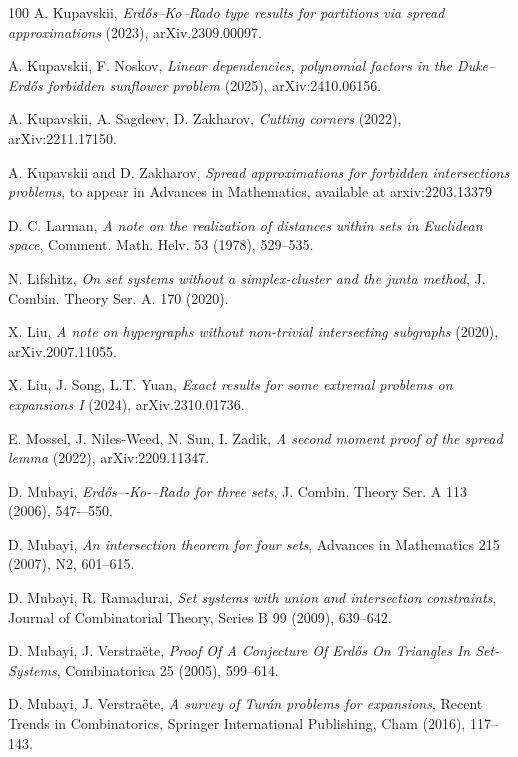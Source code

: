 \documentclass[graybox]{svmult}
\begin{document}
\begin{thebibliography}{100}
 A. Kupavskii, {\it Erd\H os--Ko--Rado type results for partitions via spread approximations} (2023), arXiv.2309.00097.

 A. Kupavskii, F. Noskov, {\it Linear dependencies, polynomial factors in the Duke--Erd\H os forbidden sunflower problem} (2025), arXiv:2410.06156.


 A. Kupavskii, A. Sagdeev, D. Zakharov, {\it Cutting corners} (2022), arXiv:2211.17150.

 A. Kupavskii and D. Zakharov, {\it Spread approximations for forbidden intersections problems},  to appear in Advances in Mathematics, available at arxiv:2203.13379

 D. C. Larman, {\it A note on the realization of distances within sets in Euclidean space},
Comment. Math. Helv. 53 (1978), 529--535.

 N. Lifshitz, {\it On set systems without a simplex-cluster and the junta method}, J. Combin. Theory Ser. A. 170 (2020).


 X. Liu, {\it A note on hypergraphs without non-trivial intersecting subgraphs} (2020), arXiv.2007.11055.


 X. Liu, J. Song, L.T. Yuan, {\it Exact results for some extremal problems on expansions I} (2024), arXiv.2310.01736.

 E. Mossel, J. Niles-Weed, N. Sun, I. Zadik, {\it A second moment proof of the spread lemma} (2022), arXiv:2209.11347.

 D. Mubayi, {\it Erd\H os–-Ko-–Rado for three sets}, J. Combin. Theory Ser. A 113 (2006), 547-–550.

 D. Mubayi, {\it An intersection theorem for four sets}, Advances in Mathematics 215 (2007), N2, 601--615.


 D. Mubayi, R. Ramadurai, {\it Set systems with union and intersection constraints}, Journal of Combinatorial Theory, Series B 99 (2009), 639--642.

 D. Mubayi, J. Verstra\"ete, {\it Proof Of A Conjecture Of Erd\H os On Triangles In Set-Systems}, Combinatorica 25 (2005), 599–614.


 D. Mubayi, J. Verstra\"ete, {\it A survey of Tur\'an problems for expansions},  Recent Trends in Combinatorics, Springer International Publishing, Cham (2016), 117--143.



\end{thebibliography}
\end{document}
